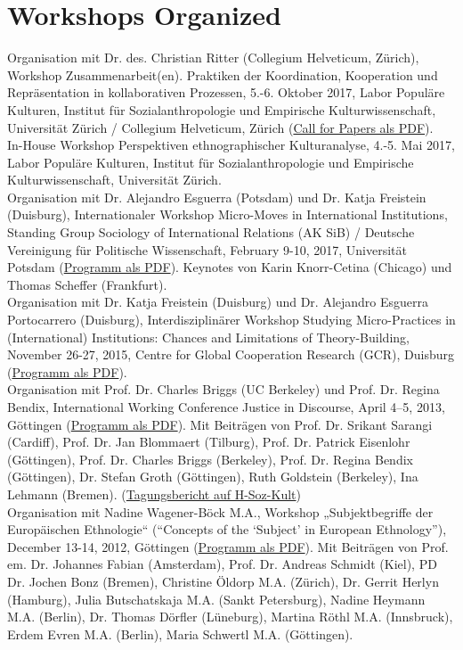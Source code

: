 \documentclass[11pt, a4paper]{article} %
\begin{document}
\section*{Workshops Organized}
    Organisation mit Dr. des. Christian Ritter (Collegium Helveticum, Zürich), Workshop Zusammenarbeit(en). Praktiken der Koordination, Kooperation und Repräsentation in kollaborativen Prozessen, 5.-6. Oktober 2017, Labor Populäre Kulturen, Institut für Sozialanthropologie und Empirische Kulturwissenschaft, Universität Zürich / Collegium Helveticum, Zürich (\href{http://www.stefangroth.com/assets/pdf/CfP_Zusammenarbeiten_Zürich.pdf}{Call for Papers als PDF}).\\[.25cm]
    In-House Workshop Perspektiven ethnographischer Kulturanalyse, 4.-5. Mai 2017, Labor Populäre Kulturen, Institut für Sozialanthropologie und Empirische Kulturwissenschaft, Universität Zürich.\\[.25cm]
    Organisation mit Dr. Alejandro Esguerra (Potsdam) und Dr. Katja Freistein (Duisburg), Internationaler Workshop Micro-Moves in International Institutions, Standing Group Sociology of International Relations (AK SiB) / Deutsche Vereinigung für Politische Wissenschaft, February 9-10, 2017, Universität Potsdam (\href{https://stefangroth.com/img/micromoves-program.pdf}{Programm als PDF}). Keynotes von Karin Knorr-Cetina (Chicago) und Thomas Scheffer (Frankfurt).\\[.25cm]
    Organisation mit Dr. Katja Freistein (Duisburg) und Dr. Alejandro Esguerra Portocarrero (Duisburg), Interdisziplinärer Workshop Studying Micro-Practices in (International) Institutions: Chances and Limitations of Theory-Building, November 26-27, 2015, Centre for Global Cooperation Research (GCR), Duisburg (\href{https://stefangroth.com/img/micro-programm.pdf}{Programm als PDF}).\\[.25cm]
    Organisation mit Prof. Dr. Charles Briggs (UC Berkeley) und Prof. Dr. Regina Bendix, International Working Conference Justice in Discourse, April 4–5, 2013, Göttingen (\href{https://stefangroth.com/img/justice-programm.pdf}{Programm als PDF}). Mit Beiträgen von Prof. Dr. Srikant Sarangi (Cardiff), Prof. Dr. Jan Blommaert (Tilburg), Prof. Dr. Patrick Eisenlohr (Göttingen), Prof. Dr. Charles Briggs (Berkeley), Prof. Dr. Regina Bendix (Göttingen), Dr. Stefan Groth (Göttingen), Ruth Goldstein (Berkeley), Ina Lehmann (Bremen). (\href{http://www.hsozkult.de/conferencereport/id/tagungsberichte-4961}{Tagungsbericht auf H-Soz-Kult})\\[.25cm]
    Organisation mit Nadine Wagener-Böck M.A., Workshop „Subjektbegriffe der Europäischen Ethnologie“ (“Concepts of the ‘Subject’ in European Ethnology”), December 13-14, 2012, Göttingen (\href{https://stefangroth.com/img/subjekt-programm.pdf}{Programm als PDF}). Mit Beiträgen von Prof. em. Dr. Johannes Fabian (Amsterdam), Prof. Dr. Andreas Schmidt (Kiel), PD Dr. Jochen Bonz (Bremen), Christine Öldorp M.A. (Zürich), Dr. Gerrit Herlyn (Hamburg), Julia Butschatskaja M.A. (Sankt Petersburg), Nadine Heymann M.A. (Berlin), Dr. Thomas Dörfler (Lüneburg), Martina Röthl M.A. (Innsbruck), Erdem Evren M.A. (Berlin), Maria Schwertl M.A. (Göttingen).
\end{document}
